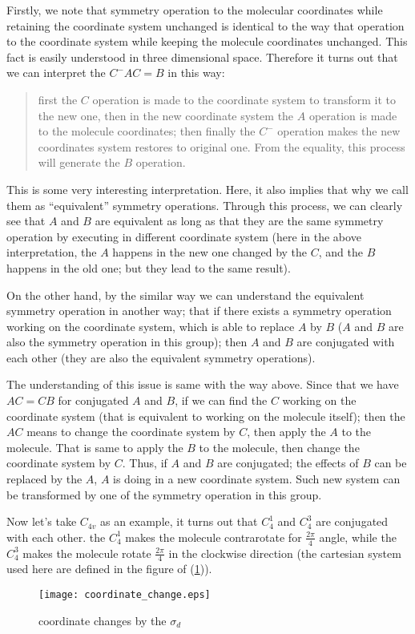 Firstly, we note that symmetry operation to the molecular coordinates
while retaining the coordinate system unchanged is identical to the
way that operation to the coordinate system while keeping the molecule
coordinates unchanged. This fact is easily understood in three
dimensional space. Therefore it turns out that we can interpret the
$C^{-}AC=B$ in this way:
\begin{quote}
  \begin{center}
    first the $C$ operation is made to the coordinate system to
    transform it to the new one, then in the new coordinate system the
    $A$ operation is made to the molecule coordinates; then finally
    the $C^{-}$ operation makes the new coordinates system restores to
    original one. From the equality, this process will generate the
    $B$ operation.
  \end{center}
\end{quote}

This is some very interesting interpretation. Here, it also implies
that why we call them as ``equivalent'' symmetry operations. Through
this process, we can clearly see that $A$ and $B$ are equivalent as
long as that they are the same symmetry operation by executing in
different coordinate system (here in the above interpretation, the $A$
happens in the new one changed by the $C$, and the $B$ happens in the
old one; but they lead to the same result).

On the other hand, by the similar way we can understand the equivalent
symmetry operation in another way; that if there exists a symmetry
operation working on the coordinate system, which is able to replace
$A$ by $B$ ($A$ and $B$ are also the symmetry operation in this
group); then $A$ and $B$ are conjugated with each other (they are also
the equivalent symmetry operations).

The understanding of this issue is same with the way above. Since that
we have $AC=CB$ for conjugated $A$ and $B$, if we can find the $C$
working on the coordinate system (that is equivalent to working on the
molecule itself); then the $AC$ means to change the coordinate system
by $C$, then apply the $A$ to the molecule. That is same to apply the
$B$ to the molecule, then change the coordinate system by $C$. Thus,
if $A$ and $B$ are conjugated; the effects of $B$ can be replaced by
the $A$, $A$ is doing in a new coordinate system. Such new system can
be transformed by one of the symmetry operation in this group.

Now let's take $C_{4v}$ as an example, it turns out that $C^{1}_{4}$
and $C^{3}_{4}$ are conjugated with each other. the $C^{1}_{4}$ makes
the molecule contrarotate for $\frac{2\pi}{4}$ angle, while the
$C^{3}_{4}$ makes the molecule rotate $\frac{2\pi}{4}$ in the
clockwise direction (the cartesian system used here are defined in the
figure of (\ref{GROUP12})).
\begin{figure}[htp]
  \begin{center}
    \texttt{[image: coordinate\_change.eps]}
    \caption{coordinate changes by the $\sigma_{d}$} \label{GROUP12}
  \end{center}
\end{figure}

